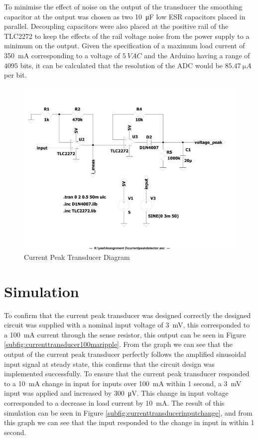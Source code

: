 To minimise the effect of noise on the output of the transducer the smoothing capacitor at the output was chosen as two \SI{10}{\micro F} low ESR capacitors placed in parallel. Decoupling capacitors were also placed at the positive rail of the TLC2272 to keep the effects of the rail voltage noise from the power supply to a minimum on the output. Given the specification of a maximum load current of \SI{350}{\milli A} corresponding to a voltage of $\SI{5}{VAC}$ and the Arduino having a range of $4095$ bits, it can be calculated that the resolution of the ADC would be $\SI{85.47}{\micro A}$ per bit.
\begin{figure}[h]
    \centering
    \includegraphics[width = 0.75\linewidth]{Figures/currentpeakdetector.pdf}
        \caption{Current Peak Transducer Diagram}
    \label{fig:currentpeakdetector.pdf}
\end{figure}

\section{Simulation} \label{sec:simulation_current_peak_transducer}
To confirm that the current peak transducer was designed correctly the designed circuit was supplied with a nominal input voltage of \SI{3}{\milli \volt}, this corresponded to a \SI{100}{\milli A} current through the sense resistor, this output can be seen in Figure \ref{subfig:currenttransducer100maripple}. From the graph we can see that the output of the current peak transducer perfectly follows the amplified sinusoidal input signal at steady state, this confirms that the circuit design was implemented successfully. To ensure that the current peak transducer responded to a \SI{10}{\milli A} change in input for inputs over \SI{100}{\milli A} within 1 second, a \SI{3}{\milli \volt} input was applied and increased by \SI{300}{\micro \volt}. This change in input voltage corresponded to a decrease in load current by \SI{10}{\milli A}. The result of this simulation can be seen in Figure \ref{subfig:currenttransducerinputchange}, and from this graph we can see that the input responded to the change in input in within 1 second. 

